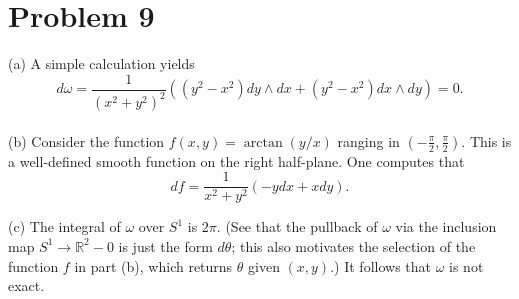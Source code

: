 \documentclass{amsart}
\numberwithin{equation}{section}
\theoremstyle{plain}
\theoremstyle{definition}
\theoremstyle{remark}
\renewcommand{\_}[2]{\underbrace{#1}_{#2}}
\renewcommand{\^}[2]{\overbrace{#1}_{#2}}
\newcommand{\R}{\mathbb{R}}
\begin{document}
\section*{Problem 9}
(a) A simple calculation yields \[d\omega = \frac{1}{(x^2+y^2)^2} \left( (y^2-x^2) dy \wedge dx + (y^2 - x^2)dx \wedge dy\right) = 0.\]\\

(b) Consider the function $f(x,y) = \arctan (y/x)$ ranging in $(-\tfrac\pi2, \tfrac\pi2)$. This is a well-defined smooth function on the right half-plane. One computes that \[df = \frac{1}{x^2+y^2} \left(-y dx + x dy \right).\]

(c) The integral of $\omega$ over $S^1$ is $2\pi$. (See that the pullback of $\omega$ via the inclusion map $S^1 \to \R^2-0$ is just the form $d\theta$; this also motivates the selection of the function $f$ in part (b), which returns $\theta$ given $(x,y)$.) It follows that $\omega$ is not exact.
\end{document}
